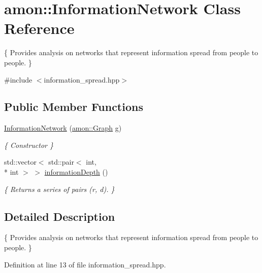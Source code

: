 \hypertarget{classamon_1_1_information_network}{\section{amon\-:\-:Information\-Network Class Reference}
\label{classamon_1_1_information_network}
}


\{ Provides analysis on networks that represent information spread from people to people. \}  




{\ttfamily \#include $<$information\-\_\-spread.\-hpp$>$}

\subsection*{Public Member Functions}
\begin{DoxyCompactItemize}
\item 
\hyperlink{classamon_1_1_information_network_ac1ac48f7de78b78667fe432ea98f17b8}{Information\-Network} (\hyperlink{classamon_1_1_graph}{amon\-::\-Graph} g)
\begin{DoxyCompactList}\small\item\em \{ Constructor \} \end{DoxyCompactList}\item 
std\-::vector$<$ std\-::pair$<$ int, \\*
int $>$ $>$ \hyperlink{classamon_1_1_information_network_ae4b4110a07671dda3f0431d36a1d94a7}{information\-Depth} ()
\begin{DoxyCompactList}\small\item\em \{ Returns a series of pairs (r, d). \} \end{DoxyCompactList}\end{DoxyCompactItemize}


\subsection{Detailed Description}
\{ Provides analysis on networks that represent information spread from people to people. \} 

Definition at line 13 of file information\-\_\-spread.\-hpp.




